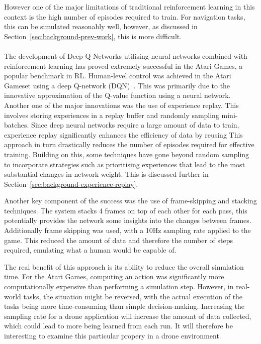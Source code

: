 However one of the major limitations of traditional reinforcement learning in this context is the high number of episodes required to train.
For navigation tasks, this can be simulated reasonably well, however, as discussed in Section~\ref{sec:background-prev-work}, this is more difficult. \\\\

The development of Deep Q-Networks utilising neural networks combined with reinforcement learning has proved extremely successful in the Atari Games, a popular benchmark in RL.
Human-level control was achieved in the Atari Gameset using a deep Q-network (DQN)~\cite{humanLevelControlDQN}.
This was primarily due to the innovative approximation of the Q-value function using a neural network.
Another one of the major innovations was the use of experience replay.
This involves storing experiences in a replay buffer and randomly sampling mini-batches.
Since deep neural networks require a large amount of data to train, experience replay significantly enhances the efficiency of data by reusing
This approach in turn drastically reduces the number of episodes required for effective training.
Building on this, some techniques have gone beyond random sampling to incorporate strategies such as prioritising experiences that lead to the most substantial changes in network weight.
This is discussed further in Section~\ref{sec:background-experience-replay}.

Another key component of the success was the use of frame-skipping and stacking techniques.
The system stacks 4 frames on top of each other for each pass, this potentially provides the network some insights into the changes between frames.
Additionally frame skipping was used, with a 10Hz sampling rate applied to the game.
This reduced the amount of data and therefore the number of steps required, emulating what a human would be capable of.

The real benefit of this approach is its ability to reduce the overall simulation time.
For the Atari Games, computing an action was significantly more computationally expensive than performing a simulation step.
However, in real-world tasks, the situation might be reversed, with the actual execution of the tasks being more time-consuming than simple decision-making.
Increasing the sampling rate for a drone application will increase the amount of data collected, which could lead to more being learned from each run.
It will therefore be interesting to examine this particular propery in a drone environment. \\\\

